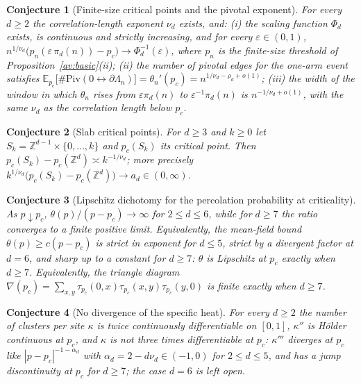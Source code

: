 \documentclass[11pt]{article}
\newtheorem{conjecture}{Conjecture}
\theoremstyle{definition}
\newcommand{\E}{\mathbb E}
\newcommand{\Z}{\mathbb Z}
\newcommand{\eps}{\varepsilon}
\providecommand{\Z}{\mathbb Z}
\providecommand{\E}{\mathbb E}
\begin{document}
\begin{conjecture}[Finite-size critical points and the pivotal exponent]\label{av4}
For every $d\ge2$ the correlation-length exponent $\nu_d$ exists, and:
{\rm(i)} the scaling function $\Phi_d$ exists, is continuous and
strictly increasing, and for every $\eps\in(0,1)$,
$n^{1/\nu_d}\bigl(p_n(\eps\,\pi_d(n))-p_c\bigr)\to\Phi_d^{-1}(\eps)$,
where $p_n$ is the finite-size threshold of Proposition~\ref{av:basic}(ii);
{\rm(ii)} the number of pivotal edges for the one-arm event satisfies
$\E_{p_c}\bigl[\#\mathrm{Piv}(0\leftrightarrow\partial\Lambda_n)\bigr]
=\theta_n'(p_c)=n^{1/\nu_d-\rho_d+o(1)}$;
{\rm(iii)} the width of the window in which $\theta_n$ rises from
$\eps\pi_d(n)$ to $\eps^{-1}\pi_d(n)$ is $n^{-1/\nu_d+o(1)}$, with the
same $\nu_d$ as the correlation length below $p_c$.
\end{conjecture}


\begin{conjecture}[Slab critical points]\label{av5}
For $d\ge3$ and $k\ge0$ let $S_k=\Z^{d-1}\times\{0,\dots,k\}$ and
$p_c(S_k)$ its critical point.  Then
$p_c(S_k)-p_c(\Z^d)\asymp k^{-1/\nu_d}$; more precisely
$k^{1/\nu_d}\bigl(p_c(S_k)-p_c(\Z^d)\bigr)\to a_d\in(0,\infty)$.
\end{conjecture}


\begin{conjecture}[Lipschitz dichotomy for the percolation probability at criticality]\label{av6}
As $p\downarrow p_c$, $\theta(p)/(p-p_c)\to\infty$ for $2\le d\le6$, while
for $d\ge7$ the ratio converges to a finite positive limit.
Equivalently, the mean-field bound $\theta(p)\ge c(p-p_c)$ is strict in
exponent for $d\le5$, strict by a divergent factor at $d=6$, and sharp
up to a constant for $d\ge7$: $\theta$ is Lipschitz at $p_c$ exactly
when $d\ge7$.  Equivalently, the triangle diagram
$\nabla(p_c)=\sum_{x,y}\tau_{p_c}(0,x)\tau_{p_c}(x,y)\tau_{p_c}(y,0)$ is
finite exactly when $d\ge7$.
\end{conjecture}


\begin{conjecture}[No divergence of the specific heat]\label{av7}
For every $d\ge2$ the number of clusters per site $\kappa$ is twice
continuously differentiable on $[0,1]$, $\kappa''$ is H\"older
continuous at $p_c$, and $\kappa$ is not three times differentiable at
$p_c$: $\kappa'''$ diverges at $p_c$ like $|p-p_c|^{-1-\alpha_d}$ with
$\alpha_d=2-d\nu_d\in(-1,0)$ for $2\le d\le5$, and has a jump
discontinuity at $p_c$ for $d\ge7$; the case $d=6$ is left open.
\end{conjecture}
\end{document}
